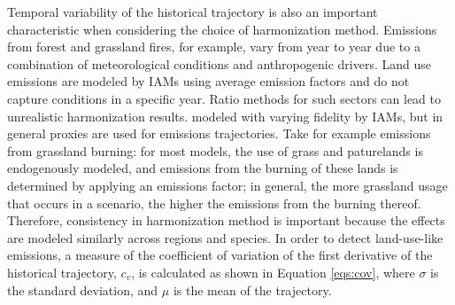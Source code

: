 Temporal variability of the historical trajectory is also an important characteristic
when considering the choice of harmonization method.  Emissions from forest and grassland fires, for example, vary from year to year due to a combination of meteorological conditions and anthropogenic drivers. Land use emissions are modeled by IAMs using average emission factors and do not capture conditions in a specific year.  Ratio methods for such sectors can lead to unrealistic harmonization results.
% 
% 
modeled with varying fidelity by IAMs, but in general proxies are used for
emissions trajectories. Take for example emissions from grassland burning: for
most models, the use of grass and paturelands is endogenously modeled, and
emissions from the burning of these lands is determined by applying an emissions
factor; in general, the more grassland usage that occurs in a scenario, the
higher the emissions from the burning thereof. Therefore, consistency in
harmonization method is important because the effects are modeled similarly
across regions and species. In order to detect land-use-like emissions,
% 
% 
% 
a measure of the coefficient of variation of the first derivative of the
historical trajectory, $c_v$, is calculated as shown in Equation \ref{eqs:cov},
where $\sigma$ is the standard deviation, and $\mu$ is the mean of the
trajectory.


